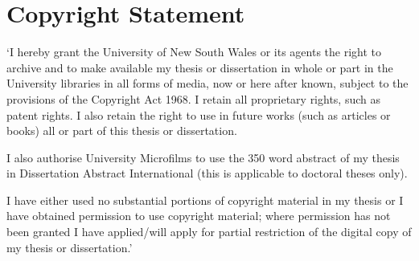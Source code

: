 \chapter*{Copyright Statement}
`I hereby grant the University of New South Wales or its agents the right to archive and to make available my thesis or dissertation in whole or part in the University libraries in all forms of media, now or here after known, subject to the provisions of the Copyright Act 1968. I retain all proprietary rights, such as patent rights. I also retain the right to use in future works (such as articles or books) all or part of this thesis or dissertation.

I also authorise University Microfilms to use the 350 word abstract of my thesis in Dissertation Abstract International (this is applicable to doctoral theses only).

I have either used no substantial portions of copyright material in my thesis or I have obtained permission to use copyright material; where permission has not been granted I have applied/will apply for partial restriction of the digital copy of my thesis or dissertation.'
